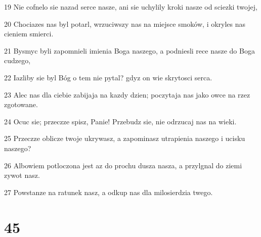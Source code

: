 \par 19 Nie cofnelo sie nazad serce nasze, ani sie uchylily kroki nasze od sciezki twojej,
\par 20 Chociazes nas byl potarl, wrzuciwszy nas na miejsce smoków, i okryles nas cieniem smierci.
\par 21 Bysmyc byli zapomnieli imienia Boga naszego, a podniesli rece nasze do Boga cudzego,
\par 22 Iazliby sie byl Bóg o tem nie pytal? gdyz on wie skrytosci serca.
\par 23 Alec nas dla ciebie zabijaja na kazdy dzien; poczytaja nas jako owce na rzez zgotowane.
\par 24 Ocuc sie; przeczze spisz, Panie! Przebudz sie, nie odrzucaj nas na wieki.
\par 25 Przeczze oblicze twoje ukrywasz, a zapominasz utrapienia naszego i ucisku naszego?
\par 26 Albowiem potloczona jest az do prochu dusza nasza, a przylgnal do ziemi zywot nasz.
\par 27 Powstanze na ratunek nasz, a odkup nas dla milosierdzia twego.

\chapter{45}

